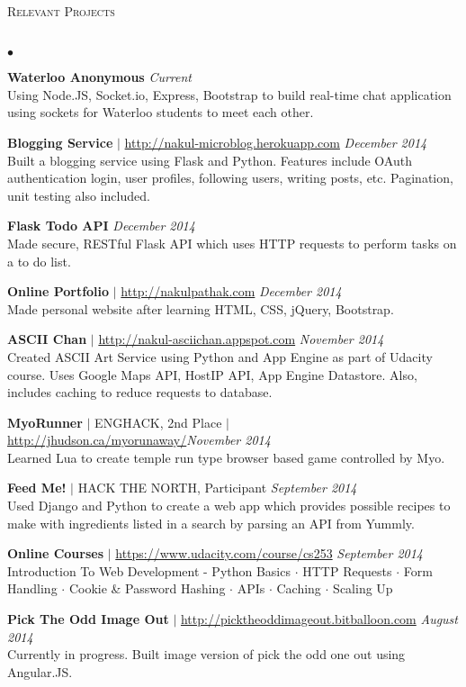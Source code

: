 \documentclass[10pt]{article}
\newcommand{\lineunder}{\vspace*{-8pt} \\ \hspace*{-18pt} \hrulefill \\}
\newcommand{\header}[1]{{\hspace*{-15pt}\vspace*{6pt} \textsc{#1}} \vspace*{-6pt} \lineunder}
\newenvironment{achievements}{\begin{list}{$\bullet$}{\topsep 0pt \itemsep -1.5pt \leftmargin 5pt}}{\vspace*{4pt}\end{list}}
\begin{document}
\header{\normalsize Relevant Projects}
\begin{achievements}
\def\UrlFont{\em}
\item \textbf{Waterloo Anonymous} \hfill \textit {Current}
\\ Using Node.JS, Socket.io, Express, Bootstrap to build real-time chat application using sockets for Waterloo students to meet each other. 
\item \textbf{Blogging Service} $|$ \url{http://nakul-microblog.herokuapp.com} \hfill \textit {December 2014}
\\ Built a blogging service using Flask and Python. Features include OAuth authentication login, user profiles, following users, writing posts, etc. Pagination, unit testing also included.
\item \textbf{Flask Todo API}  \hfill \textit {December 2014}
\\ Made secure, RESTful Flask API which uses HTTP requests to perform tasks on a to do list.
\item \textbf{Online Portfolio} $|$  \url{http://nakulpathak.com} \hfill \textit {December 2014}
\\ Made personal website after learning HTML, CSS, jQuery, Bootstrap.
\item \textbf{ASCII Chan}  $|$ \url{http://nakul-asciichan.appspot.com} \hfill \textit {November 2014}
\\ Created ASCII Art Service using Python and App Engine as part of Udacity course. Uses Google Maps API, HostIP API, App Engine Datastore. Also, includes caching to reduce requests to database. 
\item\textbf{MyoRunner}  {$|$ \scriptsize ENGHACK, 2nd Place $|$ }  \url{http://jhudson.ca/myorunaway/}\hfill \textit {November 2014}
\\ Learned Lua to create temple run type browser based game controlled by Myo.
\item \textbf{Feed Me!} {$|$ \scriptsize HACK THE NORTH, Participant}  \hfill \textit {September 2014}
\\ Used Django and Python to create a web app which provides possible recipes to make with ingredients listed in a search by parsing an API from Yummly.
\item \textbf{Online Courses} $|$ \url{https://www.udacity.com/course/cs253} \hfill \textit {September 2014}
\\ Introduction To Web Development - Python Basics $\cdot$ HTTP Requests  $\cdot$ Form Handling $\cdot$ Cookie \& Password Hashing $\cdot$ APIs $\cdot$ Caching $\cdot$ Scaling Up
\item \textbf{Pick The Odd Image Out} $|$ \url{http://picktheoddimageout.bitballoon.com} \hfill \textit{August 2014}
\\ Currently in progress. Built image version of pick the odd one out using Angular.JS. 
\end{achievements}
\end{document}
